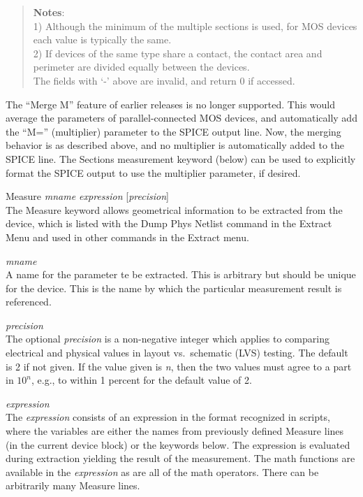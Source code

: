 \begin{description}
\begin{quote}
{\bf Notes}:\\
1) Although the minimum of the multiple sections is used, for MOS
devices each value is typically the same.\\
2) If devices of the same type share a contact, the contact
area and perimeter are divided equally between the devices.\\
The fields with `-' above are invalid, and return 0 if accessed.
\end{quote}

The ``{\vt Merge M}'' feature of earlier releases is no longer
supported.  This would average the parameters of parallel-connected
MOS devices, and automatically add the ``{\vt M=}'' (multiplier)
parameter to the SPICE output line.  Now, the merging behavior is as
described above, and no multiplier is automatically added to the SPICE
line.  The {\et Sections} measurement keyword (below) can be used to
explicitly format the SPICE output to use the multiplier parameter, if
desired.

\item{\et Measure} {\it mname expression} [{\it precision\/}]\\
The {\et Measure} keyword allows geometrical information to be
extracted from the device, which is listed with the {\cb Dump Phys
Netlist} command in the {\cb Extract Menu} and used in other
commands in the {\cb Extract menu}.

\begin{description}
\item{\it mname}\\
A name for the parameter te be extracted.  This is arbitrary but
should be unique for the device.  This is the name by which the
particular measurement result is referenced.

\item{\it precision}\\
The optional {\it precision} is a non-negative integer which applies
to comparing electrical and physical values in layout vs.~schematic
(LVS) testing.  The default is 2 if not given.  If the value given is
{\it n}, then the two values must agree to a part in $10^n$, e.g., to
within 1 percent for the default value of 2.

\item{\it expression}\\
The {\it expression} consists of an expression in the format
recognized in scripts, where the variables are either the names from
previously defined {\et Measure} lines (in the current device block)
or the keywords below.  The expression is evaluated during extraction
yielding the result of the measurement.  The math functions are
available in the {\it expression} as are all of the math operators. 
There can be arbitrarily many {\et Measure} lines.


\end{description}
\end{description}
